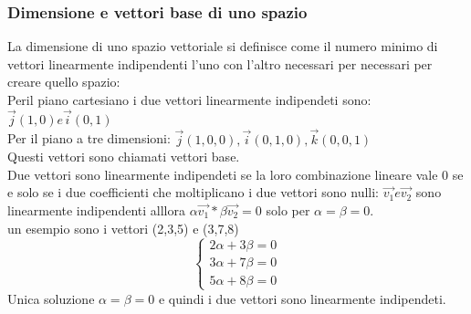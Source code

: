 \documentclass[a4paper]{article}
\begin{document}
\subsubsection{Dimensione e vettori base di uno spazio}
La dimensione di uno spazio vettoriale si definisce come il numero minimo di vettori linearmente indipendenti l'uno con l'altro necessari per necessari per creare quello spazio:
\\ Peril piano cartesiano i due vettori linearmente indipendeti sono: $\vec{j}(1,0) e \vec{i}(0,1) $
\\ Per il piano a tre dimensioni: $ \vec{j}(1,0,0), \vec{i}(0,1,0), \vec{k}(0,0,1) $
\\ Questi vettori sono chiamati vettori base.
\\Due vettori sono linearmente indipendeti se la loro combinazione lineare vale 0 se e solo se i due coefficienti che moltiplicano i due vettori sono nulli:
$\vec{v_{1}}e \vec{v_{2}} $ sono linearmente indipendenti alllora $\alpha\vec{v_{1}}*\beta\vec{v_{2}}=0$ solo per $\alpha=\beta=0 $.
\\ un esempio sono i vettori (2,3,5) e (3,7,8) \\
\[\begin{cases}
2\alpha + 3\beta=0\\
3\alpha + 7\beta=0\\
5\alpha + 8\beta=0
\end{cases}
\]
Unica soluzione $\alpha=\beta=0$ e quindi i due vettori sono linearmente indipendeti.
\\
\end{document}

